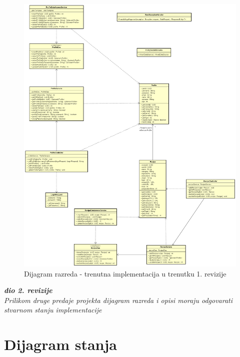  \begin{figure}[H]
			    \centering
			    \includegraphics[width=1\linewidth]{slike/dijagrami/Dijagram razreda.png}
			    \caption{Dijagram razreda - trenutna implementacija u trenutku 1. revizije}
			    \label{fig:enter-label}
			\end{figure}
   \eject
   \textbf{\textit{dio 2. revizije}}\\			
			
			\textit{Prilikom druge predaje projekta dijagram razreda i opisi moraju odgovarati stvarnom stanju implementacije}
			
			
			
			\eject
		
		\section{Dijagram stanja}

